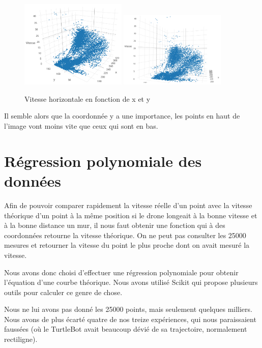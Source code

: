 \documentclass[titlepage,11pt,a4paper]{article}
\begin{document}
\begin{figure}[!h]
	\centering
	\caption{\label{vitesses-3d} Vitesse horizontale en fonction de x et y}
	\includegraphics[width=0.45\textwidth]{images/vitesses-3d-apercu.png}
	\hfill
	\includegraphics[width=0.45\textwidth]{images/vitesses-3d-selon-y.png}
\end{figure}

Il semble alors que la coordonnée y a une importance, les points en haut de l'image vont moins vite que ceux qui sont en bas.

\section{Régression polynomiale des données}
Afin de pouvoir comparer rapidement la vitesse réelle d'un point avec la vitesse théorique d'un point à la même position si le drone longeait à la bonne vitesse et à la bonne distance un mur, il nous faut obtenir une fonction qui à des coordonnées retourne la vitesse théorique. On ne peut pas consulter les \num{25000} mesures et retourner la vitesse du point le plus proche dont on avait mesuré la vitesse.

Nous avons donc choisi d'effectuer une régression polynomiale pour obtenir l'équation d'une courbe \og{}théorique\fg{}. Nous avons utilisé Scikit qui propose plusieurs outils pour calculer ce genre de chose.

Nous ne lui avons pas donné les \num{25000} points, mais seulement quelques milliers. Nous avons de plus écarté quatre de nos treize expériences, qui nous paraissaient faussées (où le TurtleBot avait beaucoup dévié de sa trajectoire, normalement rectiligne).
\end{document}
